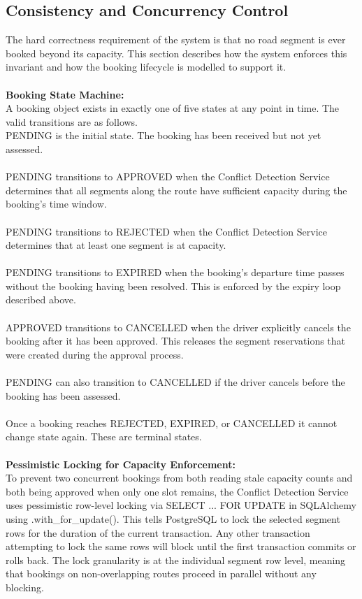 \documentclass{article}
\begin{document}
\subsection{Consistency and Concurrency Control}
The hard correctness requirement of the system is that no road segment is ever booked beyond its capacity. This section describes how the system enforces this invariant and how the booking lifecycle is modelled to support it.\\\\
\textbf{Booking State Machine:}\\
A booking object exists in exactly one of five states at any point in time. The valid transitions are as follows.\\
PENDING is the initial state. The booking has been received but not yet assessed.\\\\
PENDING transitions to APPROVED when the Conflict Detection Service determines that all segments along the route have sufficient capacity during the booking's time window.\\\\
PENDING transitions to REJECTED when the Conflict Detection Service determines that at least one segment is at capacity.\\\\
PENDING transitions to EXPIRED when the booking's departure time passes without the booking having been resolved. This is enforced by the expiry loop described above.\\\\
APPROVED transitions to CANCELLED when the driver explicitly cancels the booking after it has been approved. This releases the segment reservations that were created during the approval process.\\\\
PENDING can also transition to CANCELLED if the driver cancels before the booking has been assessed.\\\\
Once a booking reaches REJECTED, EXPIRED, or CANCELLED it cannot change state again. These are terminal states.\\\\
\textbf{Pessimistic Locking for Capacity Enforcement:}\\
To prevent two concurrent bookings from both reading stale capacity counts and both being approved when only one slot remains, the Conflict Detection Service uses pessimistic row-level locking via SELECT ... FOR UPDATE in SQLAlchemy using .with_for_update(). This tells PostgreSQL to lock the selected segment rows for the duration of the current transaction. Any other transaction attempting to lock the same rows will block until the first transaction commits or rolls back. The lock granularity is at the individual segment row level, meaning that bookings on non-overlapping routes proceed in parallel without any blocking.\\
\end{document}
